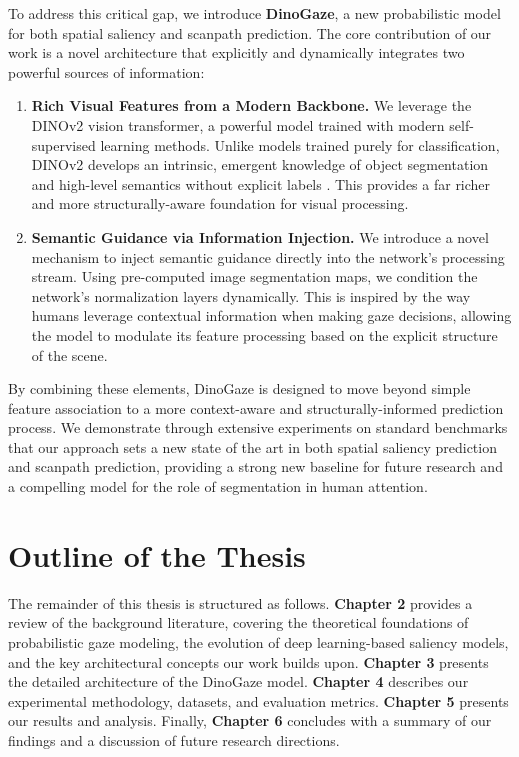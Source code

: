 To address this critical gap, we introduce \textbf{DinoGaze}, a new probabilistic model for both spatial saliency and scanpath prediction. The core contribution of our work is a novel architecture that explicitly and dynamically integrates two powerful sources of information:
\begin{enumerate}
    \item \textbf{Rich Visual Features from a Modern Backbone.} We leverage the DINOv2 vision transformer, a powerful model trained with modern self-supervised learning methods. Unlike models trained purely for classification, DINOv2 develops an intrinsic, emergent knowledge of object segmentation and high-level semantics without explicit labels \cite{oquab2023dinov2}. This provides a far richer and more structurally-aware foundation for visual processing.
    \item \textbf{Semantic Guidance via Information Injection.} We introduce a novel mechanism to inject semantic guidance directly into the network’s processing stream. Using pre-computed image segmentation maps, we condition the network's normalization layers dynamically. This is inspired by the way humans leverage contextual information when making gaze decisions, allowing the model to modulate its feature processing based on the explicit structure of the scene.
\end{enumerate}
By combining these elements, DinoGaze is designed to move beyond simple feature association to a more context-aware and structurally-informed prediction process.
We demonstrate through extensive experiments on standard benchmarks that our approach sets a new state of the art in both spatial saliency prediction and scanpath prediction, providing a strong new baseline for future research and a compelling model for the role of segmentation in human attention.

\section{Outline of the Thesis}
\label{sec:intro_outline}

The remainder of this thesis is structured as follows. \textbf{Chapter 2} provides a review of the background literature, covering the theoretical foundations of probabilistic gaze modeling, the evolution of deep learning-based saliency models, and the key architectural concepts our work builds upon. \textbf{Chapter 3} presents the detailed architecture of the DinoGaze model. \textbf{Chapter 4} describes our experimental methodology, datasets, and evaluation metrics. \textbf{Chapter 5} presents our results and analysis. Finally, \textbf{Chapter 6} concludes with a summary of our findings and a discussion of future research directions.



